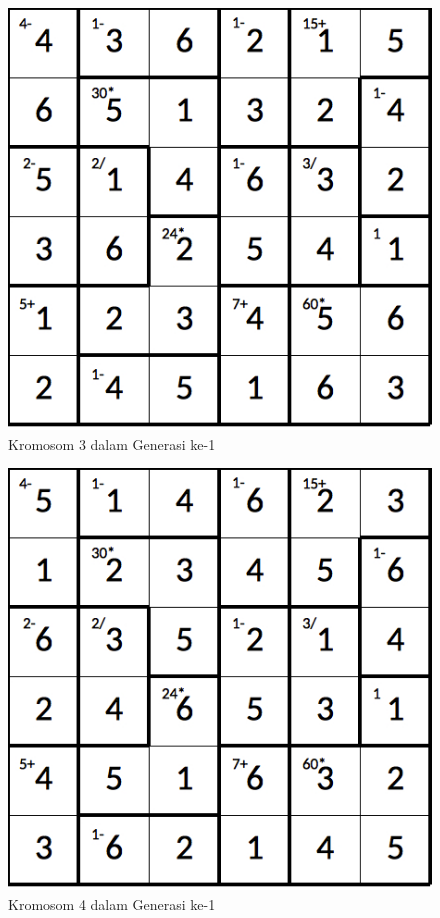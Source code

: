 \begin{figure}
\centering
\captionsetup{justification=centering}
\includegraphics[scale=0.333]{Gambar/hybridgenetic/Generation1Chromosome3}
\caption[Kromosom 3 dalam Generasi ke-1]{Kromosom 3 dalam Generasi ke-1}
\label{fig:analisisg1k3}
\end{figure}

\begin{figure}
\centering
\captionsetup{justification=centering}
\includegraphics[scale=0.333]{Gambar/hybridgenetic/Generation1Chromosome4}
\caption[Kromosom 4 dalam Generasi ke-1]{Kromosom 4 dalam Generasi ke-1}
\label{fig:analisisg1k4}
\end{figure}

